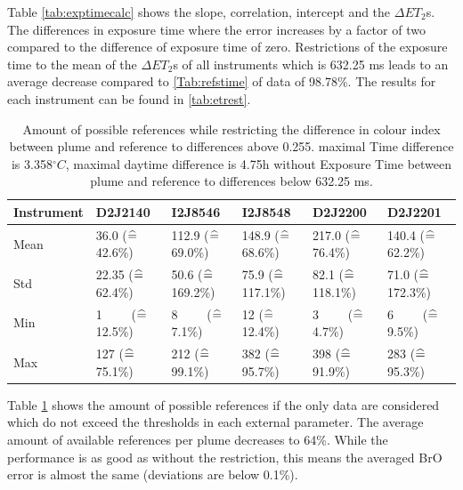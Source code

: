 %
Table \ref{tab:exptimecalc} shows the slope, correlation, intercept and the $\Delta ET_{2}$s. The differences in exposure time where the  error increases by a factor of two compared to the difference of exposure time of zero.
Restrictions of the exposure time to the mean of the $\Delta ET_{2}$s of all instruments which is 632.25 ms leads to an average decrease compared to \cref{Tab:refstime} of data of 98.78\%. The results for each instrument can be found in \cref{tab:etrest}.\\
\begin{table}
	\centering
	\begin{tabular}{|p{1.8cm}|p{2.15cm}|p{2.15cm}|p{2.15cm}|p{2.15cm}|p{2.15cm}|}
		Instrument	&D2J2140&I2J8546& I2J8548&D2J2200&D2J2201\\
		\toprule
		Mean&
		36.0 ($\mathrel{\widehat{=}}\,$42.6\%)&	112.9 ($\mathrel{\widehat{=}}\,$69.0\%)&
		148.9 ($\mathrel{\widehat{=}}\,$68.6\%)&	217.0 ($\mathrel{\widehat{=}}\,$76.4\%)&	140.4 ($\mathrel{\widehat{=}}\,$62.2\%)\\
		\midrule
		Std&
		22.35 ($\mathrel{\widehat{=}}\,$62.4\%)&
		50.6 ($\mathrel{\widehat{=}}\,$169.2\%) &
		75.9 ($\mathrel{\widehat{=}}\,$117.1\%)&
		82.1 ($\mathrel{\widehat{=}}\,$118.1\%) &
		71.0 ($\mathrel{\widehat{=}}\,$172.3\%) \\
		\midrule
		Min&
		1$\qquad$ ($\mathrel{\widehat{=}}\,$12.5\%)  &
		8$\qquad$ ($\mathrel{\widehat{=}}\,$7.1\%)  &
		12 ($\mathrel{\widehat{=}}\,$12.4\%)  &
		3$\qquad$ ($\mathrel{\widehat{=}}\,$4.7\%)   &
		6$\qquad$ ($\mathrel{\widehat{=}}\,$9.5\%)  \\
		\midrule
		Max
		&127 ($\mathrel{\widehat{=}}\,$75.1\%)
		&212 ($\mathrel{\widehat{=}}\,$99.1\%)
		&382 ($\mathrel{\widehat{=}}\,$95.7\%)
		&398 ($\mathrel{\widehat{=}}\,$91.9\%)
		&283 ($\mathrel{\widehat{=}}\,$95.3\%)\\
		\bottomrule
	\end{tabular}
	\label{tab:restrictall}
	\caption{Amount of possible references while restricting the difference in colour index  between plume and reference to differences above 0.255. maximal Time difference is 3.358$^{\circ}C$, maximal daytime difference is 4.75h without Exposure Time  between plume and reference to differences below 632.25 ms.}
\end{table}	
Table \ref{tab:restrictall} shows the amount of possible references if the only data are considered which do not exceed the thresholds in each external parameter.  The average amount of available references per plume decreases to 64\%. While the performance is as good as without the restriction, this means the averaged BrO error is almost the same (deviations are below 0.1\%).


